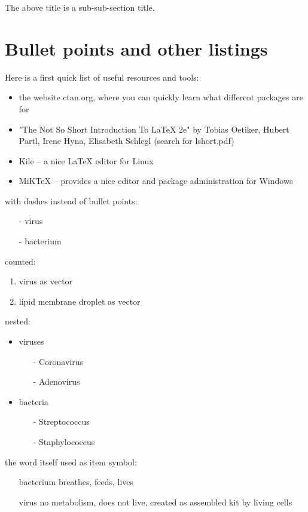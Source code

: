 The above title is a sub-sub-section title.

\section{Bullet points and other listings}

Here is a first quick list of useful resources and tools:
\begin{itemize}
\item the website ctan.org, where you can quickly learn what different packages are for
\item "The Not So Short Introduction To LaTeX 2e" by Tobias Oetiker, Hubert Partl, Irene Hyna, Elisabeth Schlegl (search for lshort.pdf)
\item Kile -- a nice LaTeX editor for Linux
\item MiKTeX -- provides a nice editor and package administration for Windows
\end{itemize}


with dashes instead of bullet points:
\begin{itemize}
\item[-] virus
\item[-] bacterium
\end{itemize}

counted:
\begin{enumerate}
\item virus as vector
\item lipid membrane droplet as vector
\end{enumerate}

nested:
\begin{itemize}
\item viruses
\begin{itemize}
\item[-] Coronavirus
\item[-] Adenovirus
\end{itemize}
\item bacteria
\begin{itemize}
\item[-] Streptococcus
\item[-] Staphylococcus
\end{itemize}
\end{itemize}

the word itself used as item symbol:
\begin{itemize}
\item[bacterium] breathes, feeds, lives
\item[virus] no metabolism, does not live, created as assembled kit by living cells
\end{itemize}

